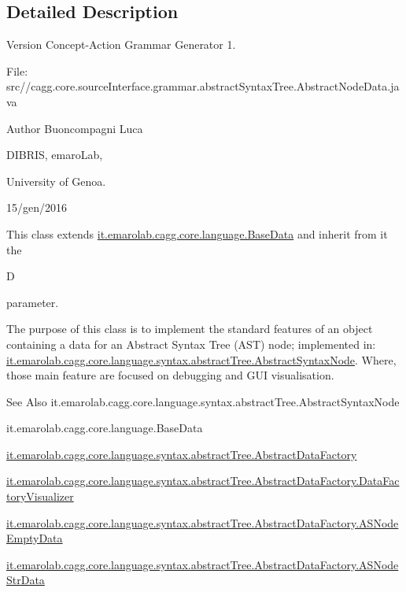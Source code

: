 \subsection{Detailed Description}
\begin{DoxyVersion}{Version}
Concept-\/\-Action Grammar Generator 1. \par
 File\-: src//cagg.core.\-source\-Interface.\-grammar.\-abstract\-Syntax\-Tree.\-Abstract\-Node\-Data.\-java \par

\end{DoxyVersion}
\begin{DoxyAuthor}{Author}
Buoncompagni Luca \par
 D\-I\-B\-R\-I\-S, emaro\-Lab,\par
 University of Genoa. \par
 15/gen/2016 \par

\end{DoxyAuthor}


This class extends \hyperlink{}{it.\-emarolab.\-cagg.\-core.\-language.\-Base\-Data} and inherit from it the
\begin{DoxyCode}
D 
\end{DoxyCode}
 parameter.\par
 The purpose of this class is to implement the standard features of an object containing a data for an Abstract Syntax Tree (A\-S\-T) node; implemented in\-: \hyperlink{}{it.\-emarolab.\-cagg.\-core.\-language.\-syntax.\-abstract\-Tree.\-Abstract\-Syntax\-Node}. Where, those main feature are focused on debugging and G\-U\-I visualisation. 

\begin{DoxySeeAlso}{See Also}
it.\-emarolab.\-cagg.\-core.\-language.\-syntax.\-abstract\-Tree.\-Abstract\-Syntax\-Node 

it.\-emarolab.\-cagg.\-core.\-language.\-Base\-Data 

\hyperlink{classit_1_1emarolab_1_1cagg_1_1core_1_1language_1_1syntax_1_1abstractTree_1_1AbstractDataFactory}{it.\-emarolab.\-cagg.\-core.\-language.\-syntax.\-abstract\-Tree.\-Abstract\-Data\-Factory} 

\hyperlink{classit_1_1emarolab_1_1cagg_1_1core_1_1language_1_1syntax_1_1abstractTree_1_1AbstractDataFactory_1_1DataFactoryVisualizer}{it.\-emarolab.\-cagg.\-core.\-language.\-syntax.\-abstract\-Tree.\-Abstract\-Data\-Factory.\-Data\-Factory\-Visualizer} 

\hyperlink{classit_1_1emarolab_1_1cagg_1_1core_1_1language_1_1syntax_1_1abstractTree_1_1AbstractDataFactory_1_1ASNodeEmptyData}{it.\-emarolab.\-cagg.\-core.\-language.\-syntax.\-abstract\-Tree.\-Abstract\-Data\-Factory.\-A\-S\-Node\-Empty\-Data} 

\hyperlink{classit_1_1emarolab_1_1cagg_1_1core_1_1language_1_1syntax_1_1abstractTree_1_1AbstractDataFactory_1_1ASNodeStrData}{it.\-emarolab.\-cagg.\-core.\-language.\-syntax.\-abstract\-Tree.\-Abstract\-Data\-Factory.\-A\-S\-Node\-Str\-Data}
\end{DoxySeeAlso}

